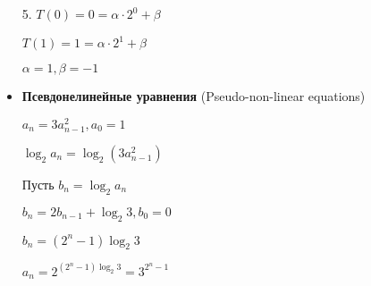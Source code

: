 \documentclass[12pt]{article}
\begin{document}
\begin{itemize}
        5. $T(0) = 0 = \alpha \cdot 2^0 + \beta$

        $T(1) = 1 = \alpha \cdot 2^1 + \beta$

        $\alpha = 1, \beta = -1$

        \vspace{5mm}

        \item \textbf{Псевдонелинейные уравнения} (Pseudo-non-linear equations)

        \Ex $a_n = 3a_{n - 1}^2, a_0 = 1$

        $\log_2 a_n = \log_2 (3a_{n - 1}^2)$

        Пусть $b_n = \log_2 a_n$

        $b_n = 2b_{n - 1} + \log_2 3, b_0 = 0$

        $b_n = (2^n - 1)\log_2 3$

        $a_n = 2^{(2^n - 1)\log_2 3} = 3^{2^n - 1}$

    \end{itemize}
\end{document}
